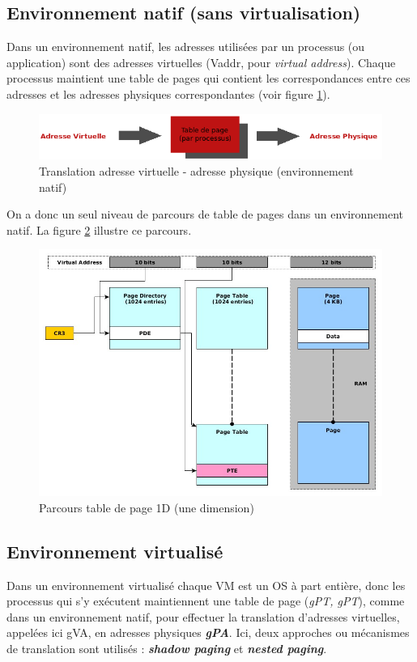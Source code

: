 \subsection{Environnement natif (sans virtualisation)}
Dans un environnement natif, les adresses utilisées par un processus (ou application) sont des adresses virtuelles (Vaddr, pour \textit{virtual address}). Chaque processus maintient une table de pages qui contient les correspondances entre ces adresses et les adresses physiques correspondantes (voir figure \ref{fig:vaddr_paddr_natif}).

\begin{figure}[H]
    \centering
    \includegraphics[scale=.65]{chapters/1/fig1/vaddr_paddr}
    \caption{Translation adresse virtuelle - adresse physique (environnement natif)}
    \label{fig:vaddr_paddr_natif}
\end{figure}

\noindent On a donc un seul niveau de parcours de table de pages dans un environnement natif. La figure \ref{fig:parcours_1D} illustre ce parcours.

\begin{figure}[H]
    \centering
    \includegraphics[scale=.55]{chapters/1/fig1/parcours_1D}
    \caption{Parcours table de page 1D (une dimension)}
    \label{fig:parcours_1D}
\end{figure}

\subsection{Environnement virtualisé}
Dans un environnement virtualisé chaque VM est un OS à part entière, donc les processus qui s'y exécutent maintiennent une table de page (\textit{\acl{gPT}, \acs{gPT}}), comme dans un environnement natif, pour effectuer la translation d'adresses virtuelles, appelées ici \ac{gVA}, en adresses physiques \textit{\textbf{\ac{gPA}}}. Ici, deux approches ou mécanismes de translation sont utilisés : \textit{\textbf{shadow paging}} et \textit{\textbf{nested paging}}.\\

